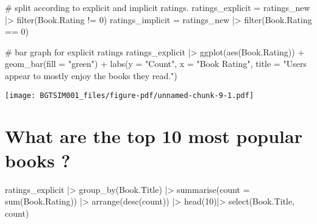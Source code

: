 \documentclass[
]{report}
\newenvironment{Shaded}{\begin{snugshade}}{\end{snugshade}}
\newcommand{\AttributeTok}[1]{\textcolor[rgb]{0.40,0.45,0.13}{#1}}
\newcommand{\CommentTok}[1]{\textcolor[rgb]{0.37,0.37,0.37}{#1}}
\newcommand{\DecValTok}[1]{\textcolor[rgb]{0.68,0.00,0.00}{#1}}
\newcommand{\FunctionTok}[1]{\textcolor[rgb]{0.28,0.35,0.67}{#1}}
\newcommand{\NormalTok}[1]{\textcolor[rgb]{0.00,0.23,0.31}{#1}}
\newcommand{\OtherTok}[1]{\textcolor[rgb]{0.00,0.23,0.31}{#1}}
\newcommand{\SpecialCharTok}[1]{\textcolor[rgb]{0.37,0.37,0.37}{#1}}
\newcommand{\StringTok}[1]{\textcolor[rgb]{0.13,0.47,0.30}{#1}}
\begin{document}
\begin{Shaded}
\begin{Highlighting}[]
\CommentTok{\# split according to explicit and implicit ratings. }
\NormalTok{ratings\_explicit }\OtherTok{=}\NormalTok{ ratings\_new }\SpecialCharTok{|\textgreater{}} \FunctionTok{filter}\NormalTok{(Book.Rating }\SpecialCharTok{!=} \DecValTok{0}\NormalTok{)}
\NormalTok{ratings\_implicit }\OtherTok{=}\NormalTok{ ratings\_new }\SpecialCharTok{|\textgreater{}} \FunctionTok{filter}\NormalTok{(Book.Rating }\SpecialCharTok{==} \DecValTok{0}\NormalTok{)}

\CommentTok{\# bar graph for explicit ratings }
\NormalTok{ratings\_explicit }\SpecialCharTok{|\textgreater{}} \FunctionTok{ggplot}\NormalTok{(}\FunctionTok{aes}\NormalTok{(Book.Rating)) }\SpecialCharTok{+} \FunctionTok{geom\_bar}\NormalTok{(}\AttributeTok{fill =} \StringTok{"green"}\NormalTok{) }\SpecialCharTok{+}
  \FunctionTok{labs}\NormalTok{(}\AttributeTok{y =} \StringTok{"Count"}\NormalTok{, }
       \AttributeTok{x =} \StringTok{"Book Rating"}\NormalTok{,}
       \AttributeTok{title =} \StringTok{"Users appear to mostly enjoy the books they read."}\NormalTok{)}
\end{Highlighting}
\end{Shaded}

\texttt{[image: BGTSIM001\_files/figure-pdf/unnamed-chunk-9-1.pdf]}

\begin{Shaded}
\end{Shaded}

\section{What are the top 10 most popular books
?}\label{what-are-the-top-10-most-popular-books}

\begin{Shaded}
\begin{Highlighting}[]
\NormalTok{ratings\_explicit }\SpecialCharTok{|\textgreater{}} \FunctionTok{group\_by}\NormalTok{(Book.Title) }\SpecialCharTok{|\textgreater{}}
                             \FunctionTok{summarise}\NormalTok{(}\AttributeTok{count =} \FunctionTok{sum}\NormalTok{(Book.Rating)) }\SpecialCharTok{|\textgreater{}} 
                             \FunctionTok{arrange}\NormalTok{(}\FunctionTok{desc}\NormalTok{(count)) }\SpecialCharTok{|\textgreater{}} \FunctionTok{head}\NormalTok{(}\DecValTok{10}\NormalTok{)}\SpecialCharTok{|\textgreater{}}
                             \FunctionTok{select}\NormalTok{(Book.Title, count)}
\end{Highlighting}
\end{Shaded}
\end{document}
